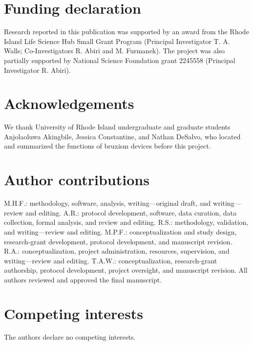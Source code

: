 \documentclass[pdflatex,sn-nature,iicol]{sn-jnl}
\begin{document}
\section*{Funding declaration}
Research reported in this publication was supported by an award from the Rhode Island Life Science Hub Small Grant Program (Principal Investigator T. A. Walls; Co-Investigators R. Abiri and M. Furmanek). The project was also partially supported by National Science Foundation grant 2245558 (Principal Investigator R. Abiri).

\section*{Acknowledgements}
We thank University of Rhode Island undergraduate and graduate students Anjolaoluwa Akingbile, Jessica Constantine, and Nathan DeSalvo, who located and summarized the functions of bruxism devices before this project.

\section*{Author contributions}
M.H.F.: methodology, software, analysis, writing---original draft, and writing---review and editing. A.R.: protocol development, software, data curation, data collection, formal analysis, and review and editing. R.S.: methodology, validation, and writing---review and editing. M.P.F.: conceptualization and study design, research-grant development, protocol development, and manuscript revision. R.A.: conceptualization, project administration, resources, supervision, and writing---review and editing. T.A.W.: conceptualization, research-grant authorship, protocol development, project oversight, and manuscript revision. All authors reviewed and approved the final manuscript.

\section*{Competing interests}
The authors declare no competing interests.
\end{document}

